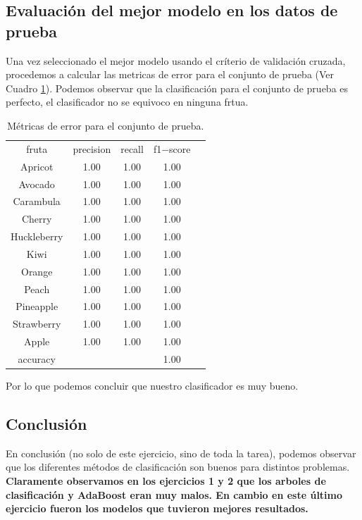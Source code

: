 \documentclass[paper=letter, fontsize=11pt]{scrartcl}
\numberwithin{equation}{section} %
\numberwithin{figure}{section} %
\numberwithin{table}{section} %
\begin{document}
\subsection{Evaluación del mejor modelo en los datos de prueba}
Una vez seleccionado el mejor modelo usando el críterio de validación cruzada, procedemos a calcular las metricas de error para el conjunto de prueba (Ver Cuadro \ref{error_o}). Podemos observar que la clasificación para el conjunto de prueba es perfecto, el clasificador no se equivoco en ninguna frtua. 
\begin{table}[H]
    \centering 
        \begin{tabular}{|c|c|c|c|c}
        \hline
fruta      & precision &  recall & f1$-$score\\
Apricot     &  1.00  &  1.00   & 1.00\\  
Avocado     &  1.00  &  1.00   & 1.00\\  
Carambula   &  1.00  &  1.00   & 1.00\\  
Cherry      &  1.00  &  1.00   & 1.00\\  
Huckleberry &  1.00  &  1.00   & 1.00\\  
Kiwi        &  1.00  &  1.00   & 1.00\\  
Orange      &  1.00  &  1.00   & 1.00\\  
Peach       &  1.00  &  1.00   & 1.00\\  
Pineapple   &  1.00  &  1.00   & 1.00\\  
Strawberry  &  1.00  &  1.00   & 1.00\\  
Apple  		&  1.00  &  1.00   & 1.00\\  \hline \hline
accuracy  & & & 1.00\\ \hline \hline
        \end{tabular}
        \caption{Métricas de error para el conjunto de prueba.} \label{error_o}  
\end{table}
Por lo que podemos concluir que nuestro clasificador es muy bueno.
\subsection{Conclusión}
En conclusión (no solo de este ejercicio, sino de toda la tarea), podemos observar que los diferentes métodos de clasificación son buenos para distintos problemas. \textbf{Claramente observamos en los ejercicios 1 y 2 que los arboles de clasificación y AdaBoost eran muy malos. En cambio en este último ejercicio fueron los modelos que tuvieron mejores resultados.}\\
\end{document}

